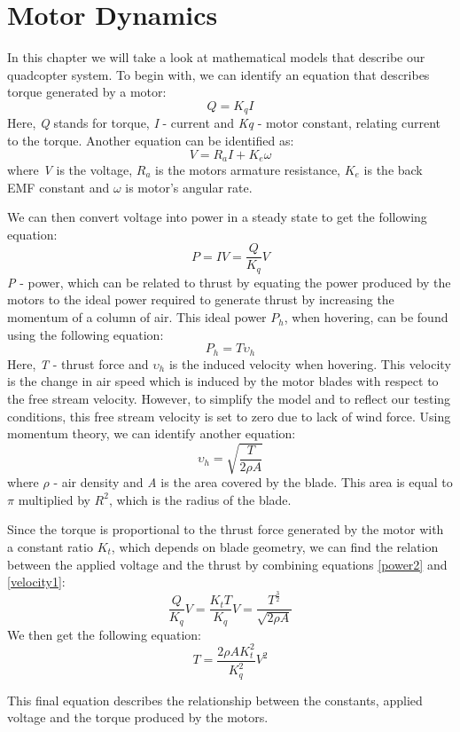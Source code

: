 \section{Motor Dynamics}
In this chapter we will take a look at mathematical models that describe our quadcopter system.
To begin with, we can identify an equation that describes torque generated by a motor:
\begin{equation}
\label{torque1}
	Q = K_qI
\end{equation}
Here, \textit{Q} stands for torque, \textit{I} - current and \textit{Kq} - motor constant, relating current to the torque.
Another equation can be identified as:
\begin{equation}
\label{voltage1}
	V = R_aI + K_e\omega
\end{equation}
where \textit{V} is the voltage, \textit{$R_a$} is the motors armature resistance, \textit{$K_e$} is the back EMF constant and \textit{$\omega$} is motor's angular rate.

We can then convert voltage into power in a steady state to get the following equation:
\begin{equation}
\label{power1}
	P = IV = \frac{Q}{K_q}V
\end{equation}
\textit{P} - power, which can be related to thrust by equating the power produced by the motors to the ideal power required to generate thrust by increasing the momentum of a column of air. This ideal power \textit{$P_h$}, when hovering, can be found using the following equation:
\begin{equation}
\label{power2}
	P_h = T\upsilon_h
\end{equation}
Here, \textit{T} - thrust force and \textit{$\upsilon_h$} is the induced velocity when hovering. This velocity is the change in air speed which is induced by the motor blades with respect to the free stream velocity. However, to simplify the model and to reflect our testing conditions, this free stream velocity is set to zero due to lack of wind force.
Using momentum theory, we can identify another equation:
\begin{equation}
\label{velocity1}
	\upsilon_h = \sqrt{\frac{T}{2\rho A}}
\end{equation}
where \textit{$\rho$} - air density and \textit{A} is the area covered by the blade. This area is equal to $\pi$ multiplied by $R^2$, which is the radius of the blade.

Since the torque is proportional to the thrust force generated by the motor with a constant ratio \textit{$K_t$}, which depends on blade geometry, we can find the relation between the applied voltage and the thrust by combining equations \ref{power2} and \ref{velocity1}:
\begin{equation}
\label{voltage2}
	\frac{Q}{K_q}V = \frac{K_tT}{K_q}V = \frac{T^\frac{3}{2}}{\sqrt{2\rho A}}
\end{equation}
We then get the following equation:
\begin{equation}
\label{thrust1}
	T = \frac{2\rho AK_t^2}{K_q^2}V^2
\end{equation}

This final equation describes the relationship between the constants, applied voltage and the torque produced by the motors.